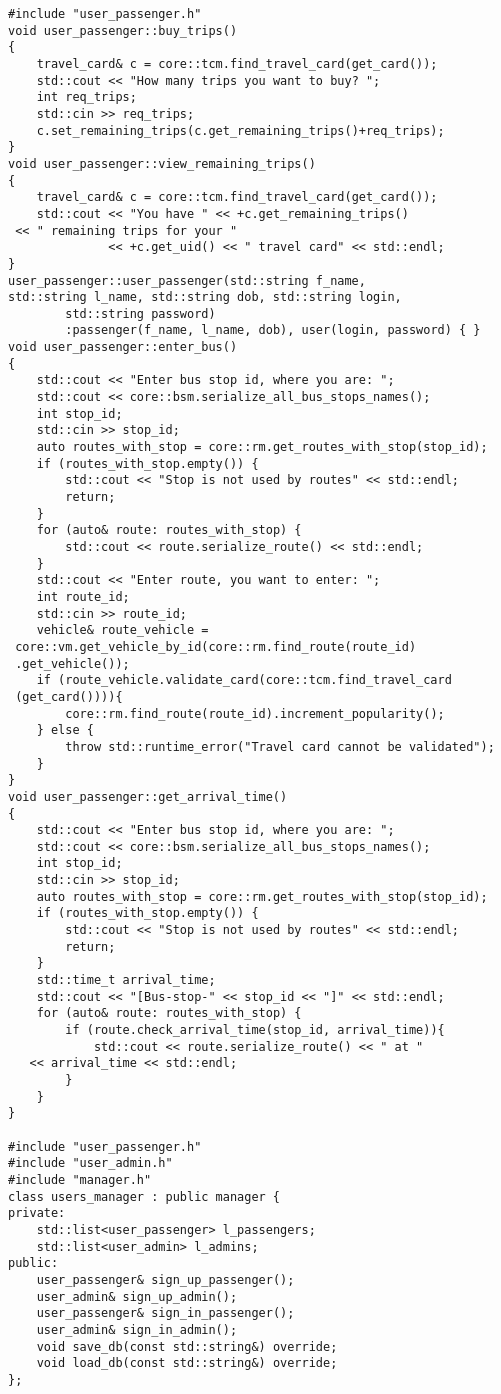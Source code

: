 \begin{verbatim}
#include "user_passenger.h"
void user_passenger::buy_trips()
{
	travel_card& c = core::tcm.find_travel_card(get_card());
	std::cout << "How many trips you want to buy? ";
	int req_trips;
	std::cin >> req_trips;
	c.set_remaining_trips(c.get_remaining_trips()+req_trips);
}
void user_passenger::view_remaining_trips()
{
	travel_card& c = core::tcm.find_travel_card(get_card());
	std::cout << "You have " << +c.get_remaining_trips()
 << " remaining trips for your "
			  << +c.get_uid() << " travel card" << std::endl;
}
user_passenger::user_passenger(std::string f_name,
std::string l_name, std::string dob, std::string login,
		std::string password)
		:passenger(f_name, l_name, dob), user(login, password) { }
void user_passenger::enter_bus()
{
	std::cout << "Enter bus stop id, where you are: ";
	std::cout << core::bsm.serialize_all_bus_stops_names();
	int stop_id;
	std::cin >> stop_id;
	auto routes_with_stop = core::rm.get_routes_with_stop(stop_id);
	if (routes_with_stop.empty()) {
		std::cout << "Stop is not used by routes" << std::endl;
		return;
	}
	for (auto& route: routes_with_stop) {
		std::cout << route.serialize_route() << std::endl;
	}
	std::cout << "Enter route, you want to enter: ";
	int route_id;
	std::cin >> route_id;
	vehicle& route_vehicle = 
 core::vm.get_vehicle_by_id(core::rm.find_route(route_id)
 .get_vehicle());
	if (route_vehicle.validate_card(core::tcm.find_travel_card
 (get_card()))){
		core::rm.find_route(route_id).increment_popularity();
	} else {
		throw std::runtime_error("Travel card cannot be validated");
	}
}
void user_passenger::get_arrival_time()
{
	std::cout << "Enter bus stop id, where you are: ";
	std::cout << core::bsm.serialize_all_bus_stops_names();
	int stop_id;
	std::cin >> stop_id;
	auto routes_with_stop = core::rm.get_routes_with_stop(stop_id);
	if (routes_with_stop.empty()) {
		std::cout << "Stop is not used by routes" << std::endl;
		return;
	}
	std::time_t arrival_time;
	std::cout << "[Bus-stop-" << stop_id << "]" << std::endl;
	for (auto& route: routes_with_stop) {
		if (route.check_arrival_time(stop_id, arrival_time)){
			std::cout << route.serialize_route() << " at " 
   << arrival_time << std::endl;
		}
	}
}

#include "user_passenger.h"
#include "user_admin.h"
#include "manager.h"
class users_manager : public manager {
private:
	std::list<user_passenger> l_passengers;
	std::list<user_admin> l_admins;
public:
	user_passenger& sign_up_passenger();
	user_admin& sign_up_admin();
	user_passenger& sign_in_passenger();
	user_admin& sign_in_admin();
	void save_db(const std::string&) override;
	void load_db(const std::string&) override;
};


\end{verbatim}
